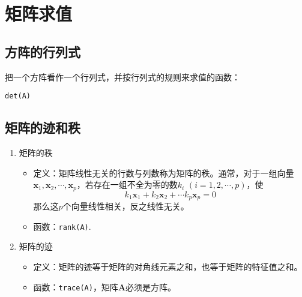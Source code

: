 \section{矩阵求值}
\subsection{方阵的行列式}
把一个方阵看作一个行列式，并按行列式的规则来求值的函数：
\begin{center}
	\lstinline|det(A)|
\end{center}

\subsection{矩阵的迹和秩}
\begin{enumerate}
	\item 矩阵的秩
	\begin{itemize}
		\item 定义：矩阵线性无关的行数与列数称为矩阵的秩。通常，对于一组向量$\bm{x}_1,\bm{x}_2,\cdots,\bm{x}_p$，若存在一组不全为零的数$k_i\,\,(i=1,2,\cdots,p)$，使
		\begin{equation}
			k_1\bm{x}_1+k_2\bm{x}_2+\cdots k_p\bm{x}_p = 0
		\end{equation}
	那么这$p$个向量线性相关，反之线性无关。
	\item 函数：\lstinline|rank(A)|.
	\end{itemize}
\item 矩阵的迹
\begin{itemize}
	\item 定义：矩阵的迹等于矩阵的对角线元素之和，也等于矩阵的特征值之和。
	\item 函数：\lstinline|trace(A)|，矩阵$\bm{A}$必须是方阵。
\end{itemize}
\end{enumerate}

